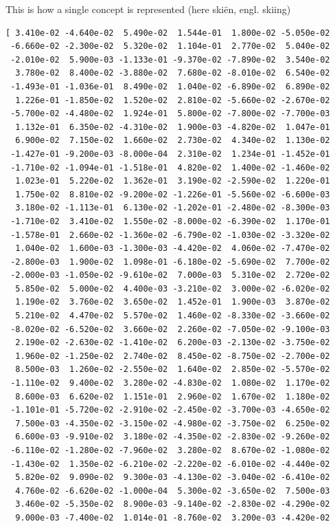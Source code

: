 \documentclass[
  letterpaper,
  DIV=11,
  numbers=noendperiod]{scrreprt}
\begin{document}
This is how a single concept is represented (here skiën, engl. skiing)

\begin{verbatim}
[ 3.410e-02 -4.640e-02  5.490e-02  1.544e-01  1.800e-02 -5.050e-02
 -6.660e-02 -2.300e-02  5.320e-02  1.104e-01  2.770e-02  5.040e-02
 -2.010e-02  5.900e-03 -1.133e-01 -9.370e-02 -7.890e-02  3.540e-02
  3.780e-02  8.400e-02 -3.880e-02  7.680e-02 -8.010e-02  6.540e-02
 -1.493e-01 -1.036e-01  8.490e-02  1.040e-02 -6.890e-02  6.890e-02
  1.226e-01 -1.850e-02  1.520e-02  2.810e-02 -5.660e-02 -2.670e-02
 -5.700e-02 -4.480e-02  1.924e-01  5.800e-02 -7.800e-02 -7.700e-03
  1.132e-01  6.350e-02 -4.310e-02  1.900e-03 -4.820e-02  1.047e-01
  6.900e-02  7.150e-02  1.660e-02  2.730e-02  4.340e-02  1.130e-02
 -1.427e-01 -9.200e-03 -8.000e-04  2.310e-02  1.234e-01 -1.452e-01
 -1.710e-02 -1.094e-01 -1.518e-01  4.820e-02  1.400e-02 -1.460e-02
  1.023e-01  5.220e-02  1.362e-01  3.190e-02 -2.590e-02  1.220e-01
  1.750e-02  8.810e-02 -9.200e-02 -1.226e-01 -5.560e-02 -6.600e-03
  3.180e-02 -1.113e-01  6.130e-02 -1.202e-01 -2.480e-02 -8.300e-03
 -1.710e-02  3.410e-02  1.550e-02 -8.000e-02 -6.390e-02  1.170e-01
 -1.578e-01  2.660e-02 -1.360e-02 -6.790e-02 -1.030e-02 -3.320e-02
  1.040e-02  1.600e-03 -1.300e-03 -4.420e-02  4.060e-02 -7.470e-02
 -2.800e-03  1.900e-02  1.098e-01 -6.180e-02 -5.690e-02  7.700e-02
 -2.000e-03 -1.050e-02 -9.610e-02  7.000e-03  5.310e-02  2.720e-02
  5.850e-02  5.000e-02  4.400e-03 -3.210e-02  3.000e-02 -6.020e-02
  1.190e-02  3.760e-02  3.650e-02  1.452e-01  1.900e-03  3.870e-02
  5.210e-02  4.470e-02  5.570e-02  1.460e-02 -8.330e-02 -3.660e-02
 -8.020e-02 -6.520e-02  3.660e-02  2.260e-02 -7.050e-02 -9.100e-03
  2.190e-02 -2.630e-02 -1.410e-02  6.200e-03 -2.130e-02 -3.750e-02
  1.960e-02 -1.250e-02  2.740e-02  8.450e-02 -8.750e-02 -2.700e-02
  8.500e-03  1.260e-02 -2.550e-02  1.640e-02  2.850e-02 -5.570e-02
 -1.110e-02  9.400e-02  3.280e-02 -4.830e-02  1.080e-02  1.170e-02
  8.600e-03  6.620e-02  1.151e-01  2.960e-02  1.670e-02  1.180e-02
 -1.101e-01 -5.720e-02 -2.910e-02 -2.450e-02 -3.700e-03 -4.650e-02
  7.500e-03 -4.350e-02 -3.150e-02 -4.980e-02 -3.750e-02  6.250e-02
  6.600e-03 -9.910e-02  3.180e-02 -4.350e-02 -2.830e-02 -9.260e-02
 -6.110e-02 -1.280e-02 -7.960e-02  3.280e-02  8.670e-02 -1.080e-02
 -1.430e-02  1.350e-02 -6.210e-02 -2.220e-02 -6.010e-02 -4.440e-02
  5.820e-02  9.090e-02  9.300e-03 -4.130e-02 -3.040e-02 -6.410e-02
  4.760e-02 -6.620e-02 -1.000e-04  5.300e-02 -3.650e-02  7.500e-03
  3.460e-02 -5.350e-02  8.900e-03 -9.140e-02 -2.830e-02 -4.290e-02
  9.000e-03 -7.400e-02  1.014e-01 -8.760e-02  3.200e-03 -4.420e-02

\end{verbatim}
\end{document}
